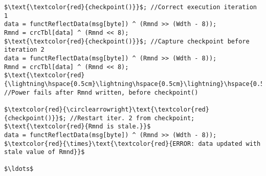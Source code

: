 \documentclass[border={20pt 5pt 25pt 10pt}]{standalone} %
\begin{document}
	

\begin{lstlisting}[style = mystyle]
$\text{\textcolor{red}{checkpoint()}}$; //Correct execution iteration 1 
data = functReflectData(msg[byte]) ^ (Rmnd >> (Wdth - 8));
Rmnd = crcTbl[data] ^ (Rmnd << 8);
$\text{\textcolor{red}{checkpoint()}}$; //Capture checkpoint before iteration 2
data = functReflectData(msg[byte]) ^ (Rmnd >> (Wdth - 8));
Rmnd = crcTbl[data] ^ (Rmnd << 8);      
$\text{\textcolor{red}{\lightning\hspace{0.5cm}\lightning\hspace{0.5cm}\lightning}\hspace{0.5cm}}$ //Power fails after Rmnd written, before checkpoint()

$\textcolor{red}{\circlearrowright}\text{\textcolor{red}{checkpoint()}}$; //Restart iter. 2 from checkpoint; $\text{\textcolor{red}{Rmnd is stale.}}$
data = functReflectData(msg[byte]) ^ (Rmnd >> (Wdth - 8)); 
$\textcolor{red}{\times}\text{\textcolor{red}{ERROR: data updated with stale value of Rmnd}}$

$\ldots$
\end{lstlisting} 
\end{document}
